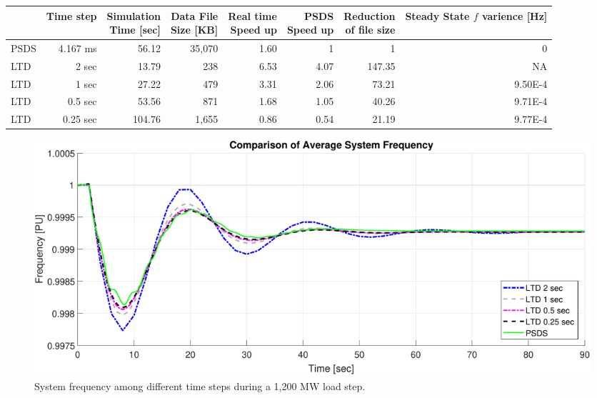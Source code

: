 \documentclass[12pt]{article}
\begin{document}
\begin{table}[!ht]
	\centering
	\footnotesize %
	\begin{tabular}{@{} lrrrrrrr @{}} 	
		\toprule %
		  & Time step  & \shortstack{Simulation\\ Time [sec] } & \shortstack{Data File \\Size [KB] }  & \shortstack{Real time \\Speed up}& \shortstack{ PSDS\\Speed up} & \shortstack{Reduction \\ of file size}  & \shortstack{Steady State $f$ \\ varience [Hz]}\\
		\midrule		
		PSDS	& 4.167 ms &  56.12   & 35,070 & 1.60& 1 & 1 & 0\\
		LTD		&	2 sec	& 13.79   &	238 &6.53&4.07 & 147.35 & NA \\ %
		LTD		&	1 sec	& 27.22   &	479 &3.31&2.06 & 73.21& 9.50E-4\\ %
		LTD		&	0.5 sec	& 53.56   &	871 &1.68&1.05 & 40.26 & 9.71E-4\\ %
		LTD		&	0.25 sec	& 104.76   &	1,655 &0.86&0.54 & 21.19& 9.77E-4\\ %
		\bottomrule
	\end{tabular}
\end{table} 
\vspace{-1em}
	\begin{figure}[h!]
			\centering
			\includegraphics[width=\linewidth]{tsComp}\vspace{-1em}
			\caption{System frequency among different time steps during a 1,200 MW load step.}
			\label{tsComp}		 
	\end{figure}\vspace{-.5em}
\end{document}
